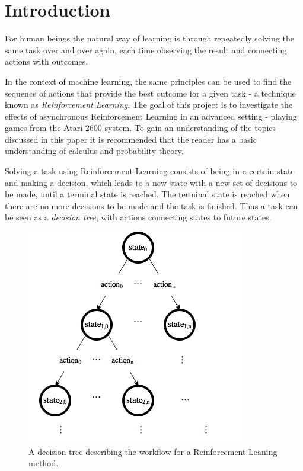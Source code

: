 \documentclass[11pt]{article}
\begin{document}
\maketitle

\section{Introduction}

For human beings the natural way of learning is through repeatedly solving the same
task over and over again, each time observing the result and connecting
actions with outcomes.

In the context of machine learning, the same principles can be used to find the
sequence of actions that provide the best outcome for a given task
- a technique known as \textit{Reinforcement Learning}.
The goal of this project is to investigate the effects of asynchronous Reinforcement
Learning in an advanced setting - playing games from the Atari 2600 system\cite{openAIEnvs}.
To gain an understanding of the topics discussed in this paper it is recommended
that the reader has a basic understanding of calculus and
probability theory.

Solving a task using Reinforcement Learning consists of being in a certain state and making a decision,
which leads to a new state with a new set of decisions to be made, until
a terminal state is reached.
The terminal state is reached when there are no more decisions to be made
and the task is finished.
Thus a task can be seen as a \textit{decision tree}, with actions connecting states to future states.
\begin{figure}[H]
    \centering
    \includegraphics[scale=0.5]{include/decision_tree.png}
    \caption{A decision tree describing the workflow for a Reinforcement Leaning
    method.}
    \label{fig:dec_tree}
\end{figure}
\end{document}
